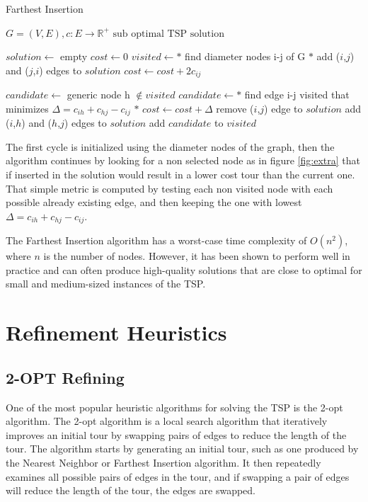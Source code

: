 \begin{algorithm}[!h]
    \caption{Farthest Insertion}\label{algo:extramileage}
    \begin{algorithmic}[1]
    \Require $G = (V,E), c:E \to \mathbb{R}^+$
    \Ensure $\text{sub optimal TSP solution}$


    \State $solution \gets$ empty
    \State $cost \gets 0$
    \State $visited \gets  *$ find diameter nodes i-j of G $*$
    \State add ($i$,$j$) and ($j$,$i$) edges to $solution$
    \State $cost \gets cost + 2 c_{ij}$
   




    \State $candidate \gets $ generic node h $ \notin visited$
    \State $candidate \gets *$ find edge i-j visited that minimizes $\Delta = c_{ih} + c_{hj} - c_{ij}$ $*$
    \State $cost \gets cost + \Delta$
    \State remove ($i$,$j$) edge to $solution$
    \State add ($i$,$h$) and ($h$,$j$) edges to $solution$
    \State add $candidate$ to $visited$


    \EndWhile






    \end{algorithmic}
\end{algorithm}

The first cycle is initialized using the diameter nodes of the graph, then the algorithm continues by looking for a non selected node as in figure \ref{fig:extra} that if inserted in the solution would result in a lower cost tour than the current one.
That simple metric is computed by testing each non visited node with each possible already existing edge, and then keeping the one with lowest $\Delta = c_{ih} + c_{hj} - c_{ij}$.

The Farthest Insertion algorithm has a worst-case time complexity of $O(n^2)$, where $n$ is the number of nodes. However, it has been shown to perform well in practice and can often produce high-quality solutions that are close to optimal for small and medium-sized instances of the TSP.



\section{Refinement Heuristics}
\subsection{2-OPT Refining}\label{2OPT}
One of the most popular heuristic algorithms for solving the TSP is the 2-opt algorithm.
The 2-opt algorithm is a local search algorithm that iteratively improves an initial tour by swapping pairs of edges to reduce the length of the tour. The algorithm starts by generating an initial tour, such as one produced by the Nearest Neighbor or Farthest Insertion algorithm. It then repeatedly examines all possible pairs of edges in the tour, and if swapping a pair of edges will reduce the length of the tour, the edges are swapped.

